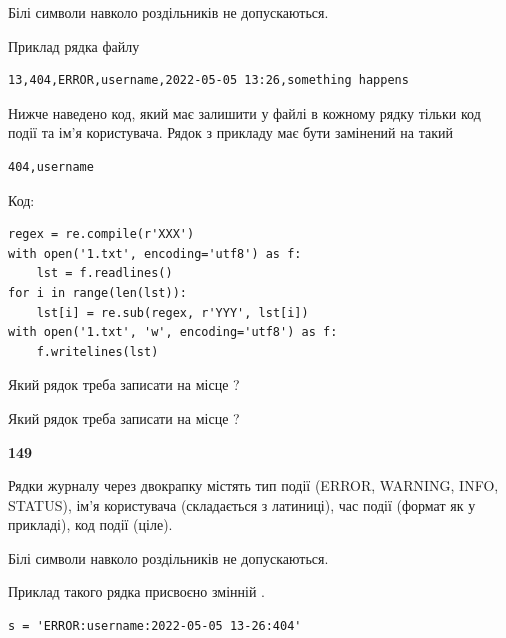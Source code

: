 Білі символи навколо роздільників не допускаються.

Приклад рядка файлу



\begin{verbatim}
13,404,ERROR,username,2022-05-05 13:26,something happens
\end{verbatim}


Нижче наведено код, який має залишити у файлі в кожному рядку тільки код події та ім'я користувача. Рядок з прикладу має бути замінений на такий



\begin{verbatim}
404,username
\end{verbatim}




Код:



\begin{verbatim}
regex = re.compile(r'XXX')
with open('1.txt', encoding='utf8') as f:
    lst = f.readlines()
for i in range(len(lst)):
    lst[i] = re.sub(regex, r'YYY', lst[i])
with open('1.txt', 'w', encoding='utf8') as f:
    f.writelines(lst)
\end{verbatim}







Який рядок треба записати на місце  ?\par
\vspace{5mm}


Який рядок треба записати на місце  ?\par


\newpage

{\begin {center}\textbf{ 149}\end {center}}\par
Рядки журналу через двокрапку містять тип події (ERROR, WARNING, INFO, STATUS), ім'я користувача (складається з латиниці), час події (фор\-мат як у прикладі), код події (ціле).

Білі символи навколо роздільників не допускаються.

Приклад такого рядка присвоєно змінній .



\begin{verbatim}
s = 'ERROR:username:2022-05-05 13-26:404'
\end{verbatim}


